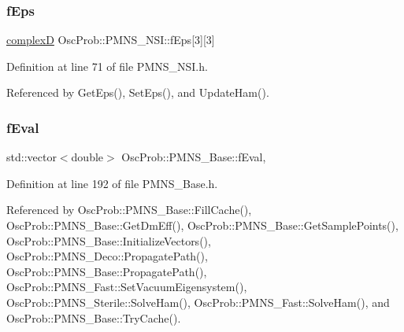 \mbox{\label{classOscProb_1_1PMNS__NSI_ab9328cb72e868b395f3efdd75b6af5e4}} 
\subsubsection{\texorpdfstring{f\+Eps}{fEps}}
{\footnotesize\ttfamily \hyperlink{EigenPoint_8h_a67ca8e107e20610c3fff78d5e726ece0}{complexD} Osc\+Prob\+::\+P\+M\+N\+S\+\_\+\+N\+S\+I\+::f\+Eps\mbox{[}3\mbox{]}\mbox{[}3\mbox{]}\hspace{0.3cm}{\ttfamily [protected]}}



Definition at line 71 of file P\+M\+N\+S\+\_\+\+N\+S\+I.\+h.



Referenced by Get\+Eps(), Set\+Eps(), and Update\+Ham().

\mbox{\label{classOscProb_1_1PMNS__Base_a6319c34d7decbb9d7d6da279c06e8c2d}} 
\subsubsection{\texorpdfstring{f\+Eval}{fEval}}
{\footnotesize\ttfamily std\+::vector$<$double$>$ Osc\+Prob\+::\+P\+M\+N\+S\+\_\+\+Base\+::f\+Eval\hspace{0.3cm}{\ttfamily [protected]}, {\ttfamily [inherited]}}



Definition at line 192 of file P\+M\+N\+S\+\_\+\+Base.\+h.



Referenced by Osc\+Prob\+::\+P\+M\+N\+S\+\_\+\+Base\+::\+Fill\+Cache(), Osc\+Prob\+::\+P\+M\+N\+S\+\_\+\+Base\+::\+Get\+Dm\+Eff(), Osc\+Prob\+::\+P\+M\+N\+S\+\_\+\+Base\+::\+Get\+Sample\+Points(), Osc\+Prob\+::\+P\+M\+N\+S\+\_\+\+Base\+::\+Initialize\+Vectors(), Osc\+Prob\+::\+P\+M\+N\+S\+\_\+\+Deco\+::\+Propagate\+Path(), Osc\+Prob\+::\+P\+M\+N\+S\+\_\+\+Base\+::\+Propagate\+Path(), Osc\+Prob\+::\+P\+M\+N\+S\+\_\+\+Fast\+::\+Set\+Vacuum\+Eigensystem(), Osc\+Prob\+::\+P\+M\+N\+S\+\_\+\+Sterile\+::\+Solve\+Ham(), Osc\+Prob\+::\+P\+M\+N\+S\+\_\+\+Fast\+::\+Solve\+Ham(), and Osc\+Prob\+::\+P\+M\+N\+S\+\_\+\+Base\+::\+Try\+Cache().


